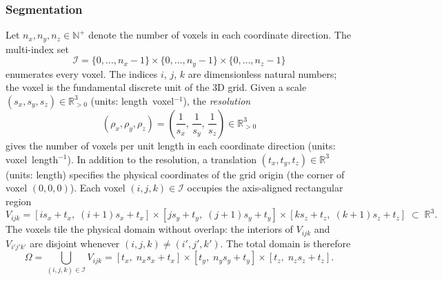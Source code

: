 \documentclass[review,12pt]{elsarticle}
\begin{document}
\subsubsection{Segmentation}

Let $n_x, n_y, n_z \in \mathbb{N}^+$ denote the number of voxels in each
coordinate direction.  The multi-index set
\begin{equation}
  \mathcal{I} = \{0,\ldots,n_x-1\}
              \times \{0,\ldots,n_y-1\}
              \times \{0,\ldots,n_z-1\}
\end{equation}
enumerates every voxel.  The indices $i$, $j$, $k$ are dimensionless natural
numbers; the voxel is the fundamental discrete unit of the 3D grid.  Given a scale
$(s_x, s_y, s_z) \in \mathbb{R}_{>0}^3$ (units: length~voxel$^{-1}$), the \emph{resolution}
\begin{equation}
  (\rho_x, \rho_y, \rho_z)
  = \left(\frac{1}{s_x},\, \frac{1}{s_y},\, \frac{1}{s_z}\right)
  \in \mathbb{R}_{>0}^3
\end{equation}
gives the number of voxels per unit length in each coordinate direction
(units: voxel~length$^{-1}$).  
In addition to the resolution, a translation $(t_x, t_y, t_z) \in \mathbb{R}^3$ (units: length) specifies the physical coordinates of the grid origin (the corner of voxel $(0,0,0)$).
Each voxel
$(i,j,k) \in \mathcal{I}$ occupies the axis-aligned rectangular region
\begin{equation}
  V_{ijk} = [i s_x + t_x,\; (i{+}1)s_x + t_x]
           \times [j s_y + t_y,\; (j{+}1)s_y + t_y]
           \times [k s_z + t_z,\; (k{+}1)s_z + t_z]
           \;\subset\; \mathbb{R}^3.
\end{equation}
The voxels tile the physical domain without overlap: the interiors of
$V_{ijk}$ and $V_{i'j'k'}$ are disjoint whenever $(i,j,k)\neq(i',j',k')$.
The total domain is therefore
\begin{equation}
  \Omega = \bigcup_{(i,j,k)\in\mathcal{I}} V_{ijk}
         = [t_x,\; n_x s_x + t_x]
           \times [t_y,\; n_y s_y + t_y]
           \times [t_z,\; n_z s_z + t_z].
\end{equation}
\end{document}
